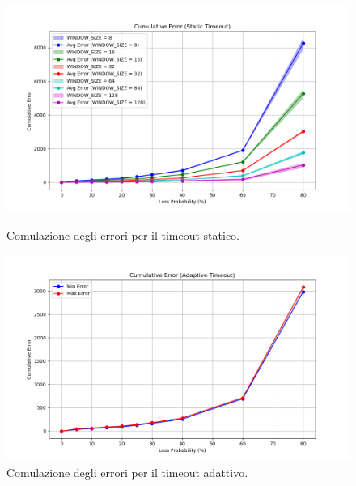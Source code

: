 \begin{figure}[htbp]
    \centering
    \begin{minipage}{0.49\textwidth}
        \centering
        \includegraphics[width=\textwidth]{imgs/04/static-cumulative-error.png}
        \caption{Comulazione degli errori per il timeout statico.}
        \label{fig:throughput_error_static}
    \end{minipage}
    \hfill
    \begin{minipage}{0.49\textwidth}
        \centering
        \includegraphics[width=\textwidth]{imgs/04/adaptive-cumulative-error.png}
        \caption{Comulazione degli errori per il timeout adattivo.}
        \label{fig:throughput_error_adaptive}
    \end{minipage}
\end{figure}

